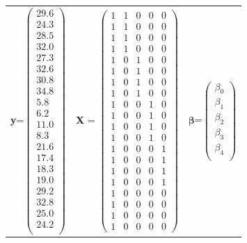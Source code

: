 \begin{center}
\begin{tabular}{ccc}
\textbf{y}=$\left(\begin{array}{c} 29.6\\24.3\\28.5\\32.0\\27.3\\32.6\\30.8\\34.8\\5.8\\6.2\\11.0\\8.3\\21.6\\17.4\\18.3\\19.0\\29.2\\32.8\\25.0\\24.2\\\end{array}\right)$ &
\textbf{X} = $\left(\begin{array}{ccccc}
1 & 1 & 0 & 0 & 0 \\
1 & 1 & 0 & 0 & 0 \\
1 & 1 & 0 & 0 & 0 \\
1 & 1 & 0 & 0 & 0 \\
1 & 0 & 1 & 0 & 0 \\
1 & 0 & 1 & 0 & 0 \\
1 & 0 & 1 & 0 & 0 \\
1 & 0 & 1 & 0 & 0 \\
1 & 0 & 0 & 1 & 0 \\
1 & 0 & 0 & 1 & 0 \\
1 & 0 & 0 & 1 & 0 \\
1 & 0 & 0 & 1 & 0 \\
1 & 0 & 0 & 0 & 1 \\
1 & 0 & 0 & 0 & 1 \\
1 & 0 & 0 & 0 & 1 \\
1 & 0 & 0 & 0 & 1 \\
1 & 0 & 0 & 0 & 0 \\
1 & 0 & 0 & 0 & 0 \\
1 & 0 & 0 & 0 & 0 \\
1 & 0 & 0 & 0 & 0
\end{array}\right)$ &
$\boldsymbol{\beta}$=$\left(\begin{array}{c} \beta_0 \\\beta_1\\\beta_2\\\beta_3\\\beta_4\\\end{array}\right)$ 
\end{tabular}
\end{center}

